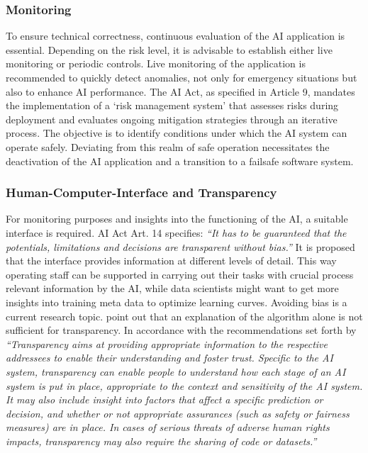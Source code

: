 \subsubsection{Monitoring}
To ensure technical correctness, continuous evaluation of the AI application is essential. Depending on the risk level, it is advisable to establish either live monitoring or periodic controls. Live monitoring of the application is recommended to quickly detect anomalies, not only for emergency situations but also to enhance AI performance. The AI Act, as specified in Article 9, mandates the implementation of a `risk management system' that assesses risks during deployment and evaluates ongoing mitigation strategies through an iterative process. The objective is to identify conditions under which the AI system can operate safely. Deviating from this realm of safe operation necessitates the deactivation of the AI application and a transition to a failsafe software system.

\subsubsection{Human-Computer-Interface and Transparency}
For monitoring purposes and insights into the functioning of the AI, a suitable interface is required. AI Act Art. 14 specifies: \emph{``It has to be guaranteed that the potentials, limitations and decisions are transparent without bias.''} It is proposed that the interface provides information at different levels of detail. This way operating staff can be supported in carrying out their tasks with crucial process relevant information by the AI, while data scientists might want to get more insights into training meta data to optimize learning curves. Avoiding bias is a current research topic. \citet{kraus2021erklarbare} point out that an explanation of the algorithm alone is not sufficient for transparency. In accordance with the recommendations set forth by \cite{Unesco2022}  \emph{``Transparency   aims   at   providing   appropriate   information to the respective addressees to enable their understanding and foster trust. Specific to the AI system, transparency  can  enable  people  to  understand  how  each  stage  of  an  AI  system  is  put  in  place,  appropriate  to  the  context  and  sensitivity  of  the  AI  system.  It  may  also  include  insight  into  factors  that  affect  a  specific  prediction  or  decision,  and  whether  or  not  appropriate  assurances  (such  as  safety  or  fairness  measures)  are  in  place. In cases of serious threats of adverse human rights impacts,  transparency  may  also  require  the  sharing  of  code or datasets.''}

